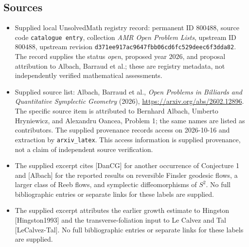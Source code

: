 \documentclass[11pt]{article}
\begin{document}
\subsection{Sources}
\begin{itemize}
\item Supplied local UnsolvedMath registry record: permanent ID \(800488\), source code \texttt{catalogue entry}, collection \emph{AMR Open Problem Lists}, upstream ID \(800488\), upstream revision \texttt{d371ee917ac9647fbb06cd6fc529deec6f3dda82}. The record supplies the status \emph{open}, proposed year \(2026\), and proposal attribution to Albach, Barraud et al.; these are registry metadata, not independently verified mathematical assessments.
\item Supplied source list: Albach, Barraud et al., \emph{Open Problems in Billiards and Quantitative Symplectic Geometry} (2026), \url{https://arxiv.org/abs/2602.12896}. The specific source item is attributed to Bernhard Albach, Umberto Hryniewicz, and Alexandru Oancea, Problem 1; the same names are listed as contributors. The supplied provenance records access on 2026-10-16 and extraction by \texttt{arxiv\_latex}. This access information is supplied provenance, not a claim of independent source verification.
\item The supplied excerpt cites [DanCG] for another occurrence of Conjecture 1 and [Albach] for the reported results on reversible Finsler geodesic flows, a larger class of Reeb flows, and symplectic diffeomorphisms of \(S^2\). No full bibliographic entries or separate links for these labels are supplied.
\item The supplied excerpt attributes the earlier growth estimate to Hingston [Hingston1993] and the transverse-foliation input to Le Calvez and Tal [LeCalvez-Tal]. No full bibliographic entries or separate links for these labels are supplied.
\end{itemize}
\end{document}

